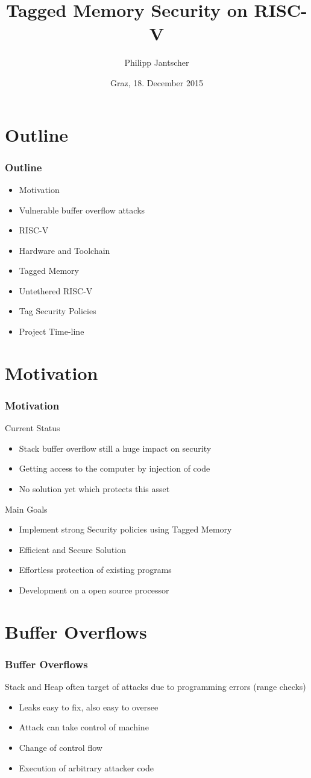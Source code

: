 \documentclass{beamer}
\title[Tagged Memory Security on RISC-V]{Tagged Memory Security on RISC-V}
\author{Philipp Jantscher}
\date{Graz, 18. December 2015}		%
\institute[IAIK]{IAIK}
\begin{document}
\titleframe

\section{Outline}
\begin{frame}
	\frametitle{Outline}
	\begin{itemize}
		\item Motivation
    	\item Vulnerable buffer overflow attacks
    	\item RISC-V
    	\item Hardware and Toolchain
    	\item Tagged Memory
    	\item Untethered RISC-V
    	\item Tag Security Policies
    	\item Project Time-line
	\end{itemize}
\end{frame}


\section{Motivation}
\begin{frame}
	\frametitle{Motivation}
	Current Status
	\begin{itemize}
		\item Stack buffer overflow still a huge impact on security
    	\item Getting access to the computer by injection of code
    	\item No solution yet which protects this asset
	\end{itemize}
	Main Goals
	\begin{itemize}
		\item Implement strong Security policies using Tagged Memory
    	\item Efficient and Secure Solution
    	\item Effortless protection of  existing programs
    	\item Development on a open source processor 
	\end{itemize}
\end{frame}

\section{Buffer Overflows}
\begin{frame}
	\frametitle{Buffer Overflows}
	Stack and Heap often target of attacks due to programming errors (range checks)
	\begin{itemize}
		\item Leaks easy to fix,  also easy to oversee
		\item Attack can take control of machine
		\item Change of control flow
		\item Execution of arbitrary attacker code
	\end{itemize}
\end{frame}
\end{document}
